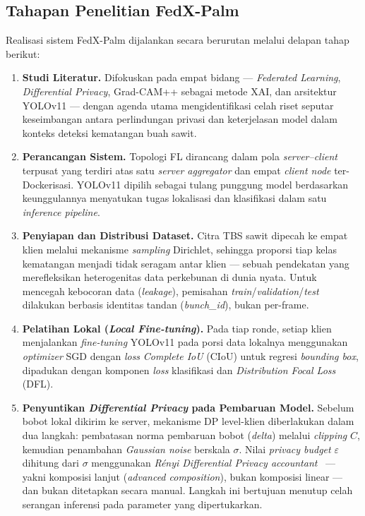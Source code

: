 \subsection{Tahapan Penelitian FedX-Palm}
Realisasi sistem FedX-Palm dijalankan secara berurutan melalui delapan tahap berikut:

\begin{enumerate}
    \item \textbf{Studi Literatur.} Difokuskan pada empat bidang --- \emph{Federated Learning}, \emph{Differential Privacy}, Grad-CAM++ sebagai metode XAI, dan arsitektur YOLOv11 --- dengan agenda utama mengidentifikasi celah riset seputar keseimbangan antara perlindungan privasi dan keterjelasan model dalam konteks deteksi kematangan buah sawit.

    \item \textbf{Perancangan Sistem.} Topologi FL dirancang dalam pola \emph{server--client} terpusat yang terdiri atas satu \emph{server aggregator} dan empat \emph{client node} ter-Dockerisasi. YOLOv11 dipilih sebagai tulang punggung model berdasarkan keunggulannya menyatukan tugas lokalisasi dan klasifikasi dalam satu \emph{inference pipeline}.

    \item \textbf{Penyiapan dan Distribusi Dataset.} Citra TBS sawit dipecah ke empat klien melalui mekanisme \emph{sampling} Dirichlet, sehingga proporsi tiap kelas kematangan menjadi tidak seragam antar klien --- sebuah pendekatan yang merefleksikan heterogenitas data perkebunan di dunia nyata. Untuk mencegah kebocoran data (\emph{leakage}), pemisahan \emph{train}/\emph{validation}/\emph{test} dilakukan berbasis identitas tandan (\emph{bunch\_id}), bukan per-frame.

    \item \textbf{Pelatihan Lokal (\emph{Local Fine-tuning}).} Pada tiap ronde, setiap klien menjalankan \emph{fine-tuning} YOLOv11 pada porsi data lokalnya menggunakan \emph{optimizer} SGD dengan \emph{loss} \emph{Complete IoU} (CIoU) untuk regresi \emph{bounding box}, dipadukan dengan komponen \emph{loss} klasifikasi dan \emph{Distribution Focal Loss} (DFL).

    \item \textbf{Penyuntikan \emph{Differential Privacy} pada Pembaruan Model.} Sebelum bobot lokal dikirim ke server, mekanisme DP level-klien diberlakukan dalam dua langkah: pembatasan norma pembaruan bobot (\emph{delta}) melalui \emph{clipping} $C$, kemudian penambahan \emph{Gaussian noise} berskala $\sigma$. Nilai \emph{privacy budget} $\varepsilon$ dihitung dari $\sigma$ menggunakan \emph{R\'enyi Differential Privacy accountant}~\cite{mironov2017renyi} --- yakni komposisi lanjut (\emph{advanced composition}), bukan komposisi linear --- dan bukan ditetapkan secara manual. Langkah ini bertujuan menutup celah serangan inferensi pada parameter yang dipertukarkan.


\end{enumerate}
